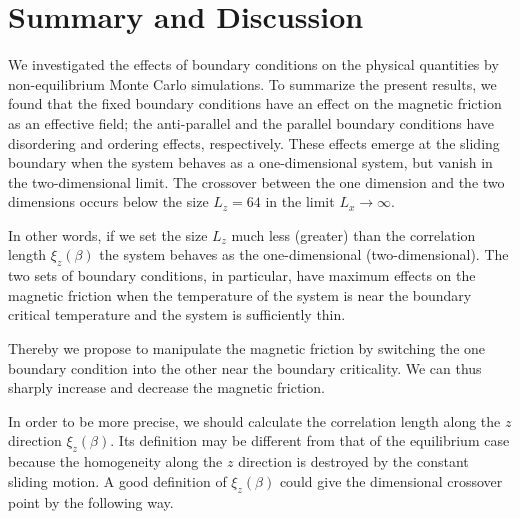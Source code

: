\chapter{Summary and Discussion}\label{chap:Summary}

We investigated the effects of boundary conditions on the physical quantities by non-equilibrium Monte Carlo simulations. To summarize the present results, we found that the fixed boundary conditions have an effect on the magnetic friction as an effective field; the anti-parallel and the parallel boundary conditions have disordering and ordering effects, respectively. These effects emerge at the sliding boundary when the system behaves as a one-dimensional system, but vanish in the two-dimensional limit. The crossover between the one dimension and the two dimensions occurs below the size $L_{z}=64$ in the limit $L_{x}\to\infty$. 

In other words, if we set the size $L_{z}$ much less (greater) than the correlation length $\xi_{z}(\beta)$ the system behaves as the one-dimensional (two-dimensional). The two sets of boundary conditions, in particular, have maximum effects on the magnetic friction when the temperature of the system is near the boundary critical temperature and the system is sufficiently thin.

Thereby we propose to manipulate the magnetic friction by switching the one boundary condition into the other near the boundary criticality. We can thus sharply increase and decrease the magnetic friction. 

In order to be more precise, we should calculate the correlation length along the $z$ direction $\xi_{z}(\beta)$. Its definition may be different from that of the equilibrium case because the homogeneity along the $z$ direction is destroyed by the constant sliding motion. A good definition of $\xi_{z}(\beta)$ could give the dimensional crossover point by the following way.

